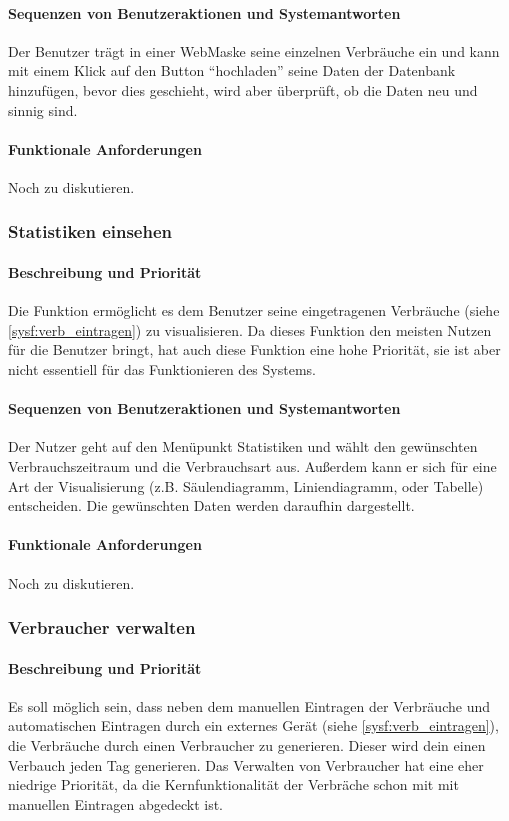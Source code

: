 \paragraph{Sequenzen von Benutzeraktionen und Systemantworten}
Der Benutzer trägt in einer WebMaske seine einzelnen Verbräuche ein und kann mit einem Klick auf den Button “hochladen” seine Daten der Datenbank hinzufügen, bevor dies geschieht, wird aber überprüft, ob die Daten neu und sinnig sind. %
\paragraph{Funktionale Anforderungen}
Noch zu diskutieren.

\subsubsection{Statistiken einsehen}
\paragraph{Beschreibung und Priorität}
Die Funktion ermöglicht es dem Benutzer seine eingetragenen Verbräuche (siehe \ref{sysf:verb_eintragen}) zu visualisieren. Da dieses Funktion den meisten Nutzen für die Benutzer bringt, hat auch diese Funktion eine hohe Priorität, sie ist aber nicht essentiell für das Funktionieren des Systems.

\paragraph{Sequenzen von Benutzeraktionen und Systemantworten}

Der Nutzer geht auf den Menüpunkt Statistiken und wählt den gewünschten Verbrauchszeitraum und die Verbrauchsart aus. Außerdem kann er sich für eine Art der Visualisierung (z.B. Säulendiagramm, Liniendiagramm, oder Tabelle) entscheiden. Die gewünschten Daten werden daraufhin dargestellt.

\paragraph{Funktionale Anforderungen}
Noch zu diskutieren.

\subsubsection{Verbraucher verwalten}

\paragraph{Beschreibung und Priorität}
Es soll möglich sein, dass neben dem manuellen Eintragen der Verbräuche und automatischen Eintragen durch ein externes Gerät (siehe \ref{sysf:verb_eintragen}), die Verbräuche durch einen Verbraucher zu generieren. Dieser wird dein einen Verbauch jeden Tag generieren. Das Verwalten von Verbraucher hat eine eher niedrige Priorität, da die Kernfunktionalität der Verbräche schon mit mit manuellen Eintragen abgedeckt ist.
